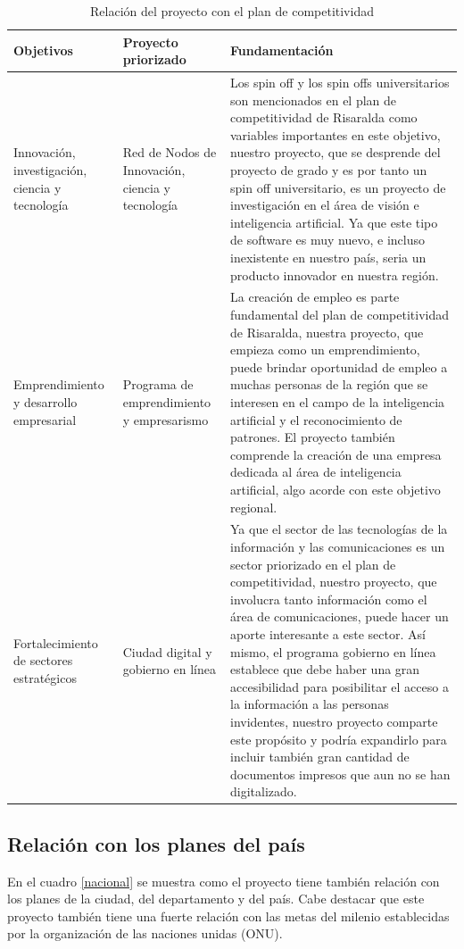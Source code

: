 \documentclass[a4paper, 12pt, oneside]{article}
\begin{document}
	\begin{table}	
		\caption{Relación del proyecto con el plan de competitividad}
		\begin{tabular}{ | p{4cm} | p{4cm} | p{14cm} | }
		\hline
		Objetivos & Proyecto priorizado & Fundamentación\\
		\hline					
		Innovación, investigación, ciencia y tecnología & Red de Nodos de Innovación, ciencia y tecnología & Los spin off y los spin offs universitarios son mencionados en el plan de competitividad de Risaralda como variables importantes en este objetivo, nuestro proyecto, que se desprende del proyecto de grado y es por tanto un spin off universitario, es un proyecto de investigación en el área de visión e inteligencia artificial. Ya que este tipo de software es muy nuevo, e incluso inexistente en nuestro país, seria un producto innovador en nuestra región. \\
		\hline
		Emprendimiento y desarrollo empresarial & Programa de emprendimiento y empresarismo & La creación de empleo es parte fundamental del plan de competitividad de Risaralda, nuestra proyecto, que empieza como un emprendimiento, puede brindar oportunidad de empleo a muchas personas de la región que se interesen en el campo de la inteligencia artificial y el reconocimiento de patrones. El proyecto también comprende la creación de una empresa dedicada al área de inteligencia artificial, algo acorde con este objetivo regional. \\
		\hline
		Fortalecimiento de sectores estratégicos & Ciudad digital y gobierno en línea & Ya que el sector de las tecnologías de la información y las comunicaciones es un sector priorizado en el plan de competitividad, nuestro proyecto, que involucra tanto información como el área de comunicaciones, puede hacer un aporte interesante a este sector. Así mismo, el programa gobierno en línea establece que debe haber una gran accesibilidad para posibilitar el acceso a la información a las personas invidentes, nuestro proyecto comparte este propósito y podría expandirlo para incluir también gran cantidad de documentos impresos que aun no se han digitalizado. \\
		\hline
		\end{tabular}
		\label{regional}
	\end{table}

	\subsection{Relación con los planes del país}
	En el cuadro \ref{nacional} se muestra como el proyecto tiene también relación con los planes de
	la ciudad, del departamento y del país. Cabe destacar que este proyecto también tiene una
	fuerte relación con las metas del milenio establecidas por la organización de las naciones
	unidas (ONU).
	
\end{document}
